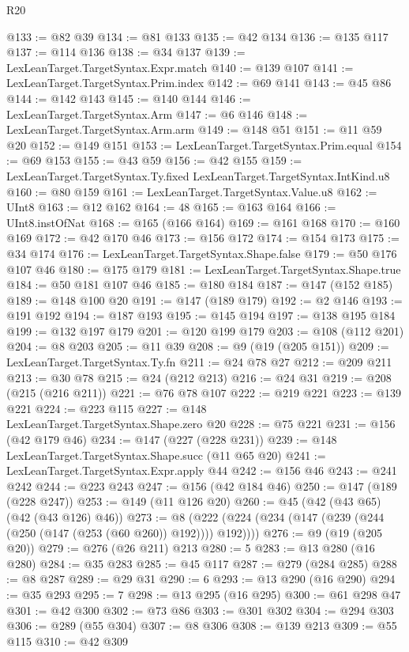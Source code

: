 \begin{lexlean}{R20}
\begin{coremodule}
@133 := @82 @39
@134 := @81 @133
@135 := @42 @134
@136 := @135 @117
@137 := @114 @136
@138 := @34 @137
@139 := LexLeanTarget.TargetSyntax.Expr.match
@140 := @139 @107
@141 := LexLeanTarget.TargetSyntax.Prim.index
@142 := @69 @141
@143 := @45 @86
@144 := @142 @143
@145 := @140 @144
@146 := LexLeanTarget.TargetSyntax.Arm
@147 := @6 @146
@148 := LexLeanTarget.TargetSyntax.Arm.arm
@149 := @148 @51
@151 := @11 @59 @20
@152 := @149 @151
@153 := LexLeanTarget.TargetSyntax.Prim.equal
@154 := @69 @153
@155 := @43 @59
@156 := @42 @155
@159 := LexLeanTarget.TargetSyntax.Ty.fixed LexLeanTarget.TargetSyntax.IntKind.u8
@160 := @80 @159
@161 := LexLeanTarget.TargetSyntax.Value.u8
@162 := UInt8
@163 := @12 @162
@164 := 48
@165 := @163 @164
@166 := UInt8.instOfNat
@168 := @165 (@166 @164)
@169 := @161 @168
@170 := @160 @169
@172 := @42 @170 @46
@173 := @156 @172
@174 := @154 @173
@175 := @34 @174
@176 := LexLeanTarget.TargetSyntax.Shape.false
@179 := @50 @176 @107 @46
@180 := @175 @179
@181 := LexLeanTarget.TargetSyntax.Shape.true
@184 := @50 @181 @107 @46
@185 := @180 @184
@187 := @147 (@152 @185)
@189 := @148 @100 @20
@191 := @147 (@189 @179)
@192 := @2 @146
@193 := @191 @192
@194 := @187 @193
@195 := @145 @194
@197 := @138 @195 @184
@199 := @132 @197 @179
@201 := @120 @199 @179
@203 := @108 (@112 @201)
@204 := @8 @203
@205 := @11 @39
@208 := @9 (@19 (@205 @151))
@209 := LexLeanTarget.TargetSyntax.Ty.fn
@211 := @24 @78 @27
@212 := @209 @211
@213 := @30 @78
@215 := @24 (@212 @213)
@216 := @24 @31
@219 := @208 (@215 (@216 @211))
@221 := @76 @78 @107
@222 := @219 @221
@223 := @139 @221
@224 := @223 @115
@227 := @148 LexLeanTarget.TargetSyntax.Shape.zero @20
@228 := @75 @221
@231 := @156 (@42 @179 @46)
@234 := @147 (@227 (@228 @231))
@239 := @148 LexLeanTarget.TargetSyntax.Shape.succ (@11 @65 @20)
@241 := LexLeanTarget.TargetSyntax.Expr.apply @44
@242 := @156 @46
@243 := @241 @242
@244 := @223 @243
@247 := @156 (@42 @184 @46)
@250 := @147 (@189 (@228 @247))
@253 := @149 (@11 @126 @20)
@260 := @45 (@42 (@43 @65) (@42 (@43 @126) @46))
@273 := @8 (@222 (@224 (@234 (@147 (@239 (@244 (@250 (@147 (@253 (@60 @260)) @192)))) @192))))
@276 := @9 (@19 (@205 @20))
@279 := @276 (@26 @211) @213
@280 := 5
@283 := @13 @280 (@16 @280)
@284 := @35 @283
@285 := @45 @117
@287 := @279 (@284 @285)
@288 := @8 @287
@289 := @29 @31
@290 := 6
@293 := @13 @290 (@16 @290)
@294 := @35 @293
@295 := 7
@298 := @13 @295 (@16 @295)
@300 := @61 @298 @47
@301 := @42 @300
@302 := @73 @86
@303 := @301 @302
@304 := @294 @303
@306 := @289 (@55 @304)
@307 := @8 @306
@308 := @139 @213
@309 := @55 @115
@310 := @42 @309

\end{coremodule}
\end{lexlean}
